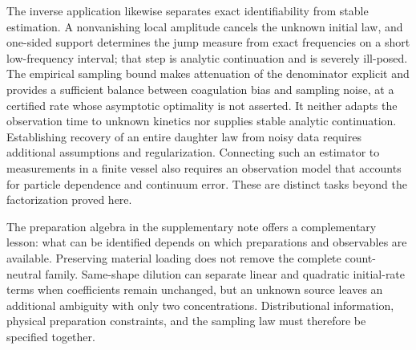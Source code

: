 The inverse application likewise separates exact identifiability
from stable estimation. A nonvanishing local amplitude cancels the
unknown initial law, and one-sided support determines the jump measure
from exact frequencies on a short low-frequency interval; that step is
analytic continuation and is severely ill-posed. The empirical sampling
bound makes attenuation of the denominator explicit and provides a
sufficient balance between coagulation bias and sampling noise, at a
certified rate whose asymptotic optimality is not asserted. It neither adapts
the observation time to unknown kinetics nor supplies stable analytic
continuation. Establishing recovery of an entire daughter law from noisy
data requires additional assumptions and regularization. Connecting
such an estimator to measurements in a finite vessel also requires an
observation model that accounts for particle dependence and continuum
error. These are distinct tasks beyond the factorization proved here.

The preparation algebra in the supplementary note offers a
complementary lesson:
what can be identified depends on which preparations and observables
are available. Preserving material loading does not remove the complete
count-neutral family. Same-shape dilution can separate linear and
quadratic initial-rate terms when coefficients remain unchanged, but
an unknown source leaves an additional ambiguity with only two
concentrations. Distributional information, physical preparation
constraints, and the sampling law must therefore be specified together.
